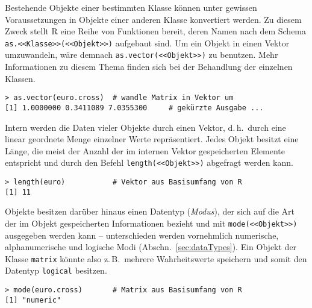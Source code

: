Bestehende Objekte einer bestimmten Klasse können unter gewissen Voraussetzungen in Objekte einer anderen Klasse konvertiert werden. Zu diesem Zweck stellt R eine Reihe von Funktionen bereit, deren Namen nach dem Schema  \lstinline!as.<<Klasse>>(<<Objekt>>)! aufgebaut sind. Um ein Objekt in einen Vektor umzuwandeln, wäre demnach \lstinline!as.vector(<<Objekt>>)! zu benutzen. Mehr Informationen zu diesem Thema finden sich bei der Behandlung der einzelnen Klassen.
\begin{lstlisting}
> as.vector(euro.cross)  # wandle Matrix in Vektor um
[1] 1.0000000 0.3411089 7.0355300     # gekürzte Ausgabe ...
\end{lstlisting}

Intern werden die Daten vieler Objekte durch einen Vektor, d.\,h.\ durch eine linear geordnete Menge einzelner Werte repräsentiert. Jedes Objekt besitzt eine Länge, die meist der Anzahl der im internen Vektor gespeicherten Elemente entspricht und durch den Befehl \lstinline!length(<<Objekt>>)! abgefragt werden kann.
\begin{lstlisting}
> length(euro)           # Vektor aus Basisumfang von R
[1] 11
\end{lstlisting}

Objekte besitzen darüber hinaus einen Datentyp (\emph{Modus}), der sich auf die Art der im Objekt gespeicherten Informationen bezieht und mit \lstinline!mode(<<Objekt>>)! ausgegeben werden kann -- unterschieden werden vornehmlich numerische, alphanumerische und logische Modi (Abschn.\ \ref{sec:dataTypes}). Ein Objekt der Klasse \lstinline!matrix! könnte also z.\,B.\ mehrere Wahrheitswerte speichern und somit den Datentyp \lstinline!logical! besitzen.
\begin{lstlisting}
> mode(euro.cross)       # Matrix aus Basisumfang von R
[1] "numeric"
\end{lstlisting}

